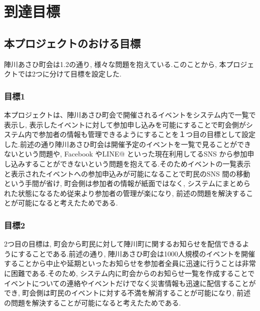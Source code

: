 \chapter{到達目標}

\section{本プロジェクトのおける目標}
  陣川あさひ町会は1.2の通り, 様々な問題を抱えている.このことから, 本プロジェクトでは2つに分けて目標を設定した.

\subsection{目標1}
  本プロジェクトは、陣川あさひ町会で開催されるイベントをシステム内で一覧で表示し, 表示したイベントに対して参加申し込みを可能にすることで町会側がシステム内で参加者の情報も管理できるようにすることを１つ目の目標として設定した.前述の通り陣川あさひ町会は開催予定のイベントを一覧で見ることができないという問題や, Facebook やLINE@ といった現在利用してるSNS から参加申し込みすることができないという問題を抱えてる.そのためイベントの一覧表示と表示されたイベントへの参加申込みが可能になることで町民のSNS 間の移動という手間が省け, 町会側は参加者の情報が紙面ではなく, システムにまとめられた状態になるため従来より参加者の管理が楽になり, 前述の問題を解決することが可能になると考えたためである.\\

\subsection{目標2}
  2つ目の目標は, 町会から町民に対して陣川町に関するお知らせを配信できるようにすることである.前述の通り, 陣川あさひ町会は1000人規模のイベントを開催することから中止や延期といったお知らせを参加者全員に迅速に行うことは非常に困難である.そのため, システム内に町会からのお知らせ一覧を作成することでイベントについての連絡やイベントだけでなく災害情報も迅速に配信することができ, 町会側は町民のイベントに対する不満を解消することが可能になり, 前述の問題を解決することが可能になると考えたためである.\\

